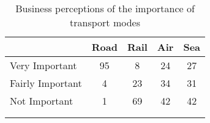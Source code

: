 \begin{longtable}{lcccc}
\hline
	& \textbf{Road} & \textbf{Rail} & \textbf{Air} & \textbf{Sea}\\ 
\hline
 Very Important & 95 & 8 & 24 & 27 \\
 Fairly Important & 4 & 23 & 34 & 31	\\
 Not Important & 1& 69 & 42 & 42	\\
\hline \\

\caption{Business perceptions of the importance of transport modes}  \label{tab:transport_modes}\\
\end{longtable}
